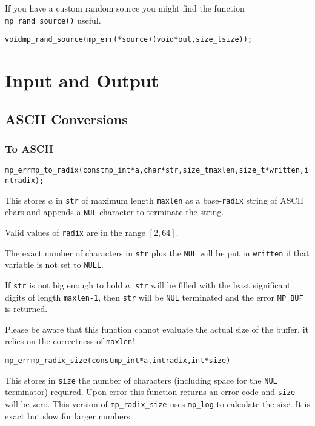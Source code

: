 \documentclass[synpaper]{book}
\begin{document}
If you have a custom random source you might find the function \texttt{mp\_rand\_source()} useful.
\begin{alltt}
void mp_rand_source(mp_err(*source)(void *out, size_t size));
\end{alltt}

\chapter{Input and Output}
\section{ASCII Conversions}
\subsection{To ASCII}
\begin{alltt}
mp_err mp_to_radix (const mp_int *a, char *str, size_t maxlen, size_t *written, int radix);
\end{alltt}
This stores $a$ in \texttt{str} of maximum length \texttt{maxlen} as a base-\texttt{radix} string
of ASCII chars and appends a \texttt{NUL} character to terminate the string.

Valid values of \texttt{radix} are in the range $[2, 64]$.

The exact number of characters in \texttt{str} plus the \texttt{NUL} will be put in
\texttt{written} if that variable is not set to \texttt{NULL}.

If \texttt{str} is not big enough to hold $a$, \texttt{str} will be filled with the least
significant digits of length \texttt{maxlen-1}, then \texttt{str} will be \texttt{NUL} terminated
and the error \texttt{MP\_BUF} is returned.

Please be aware that this function cannot evaluate the actual size of the buffer, it relies on the
correctness of \texttt{maxlen}!

\begin{alltt}
mp_err mp_radix_size (const mp_int *a, int radix, int *size)
\end{alltt}
This stores in \texttt{size} the number of characters (including space for the \texttt{NUL}
terminator) required. Upon error this function returns an error code and \texttt{size} will be
zero. This version of \texttt{mp\_radix\_size} uses \texttt{mp\_log} to calculate the size. It
is exact but slow for larger numbers.
\end{document}
